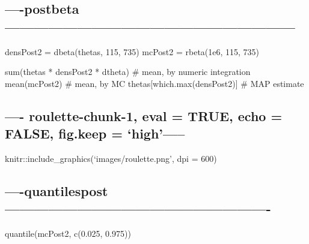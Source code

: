 \documentclass[]{article}
\begin{document}
\subsection{----postbeta------------------------------------------------------------}\label{postbeta}

densPost2 = dbeta(thetas, 115, 735) mcPost2 = rbeta(1e6, 115, 735)

sum(thetas * densPost2 * dtheta) \# mean, by numeric integration
mean(mcPost2) \# mean, by MC thetas{[}which.max(densPost2){]} \# MAP
estimate

\subsection{\texorpdfstring{---- roulette-chunk-1, eval = TRUE, echo =
FALSE, fig.keep =
`high'-----}{---- roulette-chunk-1, eval = TRUE, echo = FALSE, fig.keep = high-----}}\label{roulette-chunk-1-eval-true-echo-false-fig.keep-high}

knitr::include\_graphics(`images/roulette.png', dpi = 600)

\subsection{----quantilespost-------------------------------------------------------}\label{quantilespost-}

quantile(mcPost2, c(0.025, 0.975))
\end{document}
